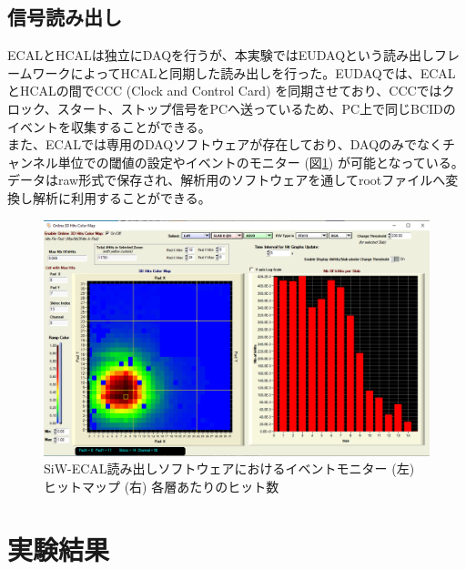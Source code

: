 \subsection{信号読み出し}
ECALとHCALは独立にDAQを行うが、本実験ではEUDAQという読み出しフレームワークによってHCALと同期した読み出しを行った。EUDAQでは、ECALとHCALの間でCCC (Clock and Control Card) を同期させており、CCCではクロック、スタート、ストップ信号をPCへ送っているため、PC上で同じBCIDのイベントを収集することができる。\\
また、ECALでは専用のDAQソフトウェア\cite{ecalsoft}が存在しており、DAQのみでなくチャンネル単位での閾値の設定やイベントのモニター (図\ref{monitor}) が可能となっている。データはraw形式で保存され、解析用のソフトウェアを通してrootファイルへ変換し解析に利用することができる。
\begin{figure}[H]
\begin{center}
 \includegraphics[keepaspectratio, scale=0.2]
 	{Figure/Beamtest/monitor.png}
 		\caption{SiW-ECAL読み出しソフトウェアにおけるイベントモニター (左) ヒットマップ (右) 各層あたりのヒット数}
		\label{monitor}
\end{center}
\end{figure}
\section{実験結果}
